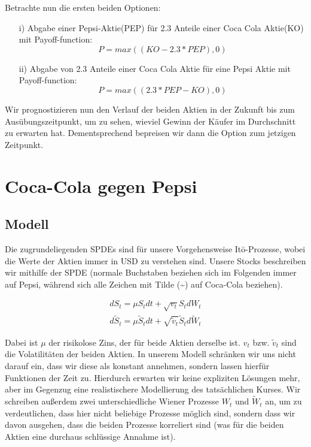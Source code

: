 \documentclass[12pt]{article}
\begin{document}
Betrachte nun die ersten beiden Optionen:
\begin{itemize}
	\item[i)] Abgabe einer Pepsi-Aktie(PEP) für 2.3 Anteile einer Coca Cola Aktie(KO) mit Payoff-function:
	\begin{equation*}
	P=max((KO-2.3*PEP),0)
	\end{equation*}			
	\item[ii)] Abgabe von 2.3 Anteile einer Coca Cola Aktie für eine Pepsi Aktie mit Payoff-function:
	\begin{equation*}
	P=max((2.3*PEP-KO),0)
	\end{equation*}			
\end{itemize}

Wir prognostizieren nun den Verlauf der beiden Aktien in der Zukunft bis zum Ausübungszeitpunkt, um zu sehen, wieviel Gewinn der Käufer im Durchschnitt zu erwarten hat. Dementsprechend bepreisen wir dann die Option zum jetzigen Zeitpunkt.


\section{Coca-Cola gegen Pepsi}

\subsection{Modell}

Die zugrundeliegenden SPDEs sind für unsere Vorgehensweise It\={o}-Prozesse, wobei die Werte der Aktien immer in USD zu verstehen sind. Unsere Stocks beschreiben wir mithilfe der SPDE (normale Buchstaben beziehen sich im Folgenden immer auf Pepsi, während sich alle Zeichen mit Tilde (\~{}) auf Coca-Cola beziehen).

\begin{align}\label{SPDEstock}
dS_t = \mu S_t dt + \sqrt{v_t} S_t dW_t \\
d\tilde{S}_t = \mu \tilde{S}_t dt + \sqrt{\tilde{v}_t} \tilde{S}_t d\tilde{W}_t
\end{align}

Dabei ist $\mu$ der risikolose Zins, der für beide Aktien derselbe ist. $v_t$ bzw. $\tilde{v}_t$ sind die Volatilitäten der beiden Aktien. In unserem Modell schränken wir uns nicht darauf ein, dass wir diese als konstant annehmen, sondern lassen hierfür Funktionen der Zeit zu. Hierdurch erwarten wir keine expliziten Lösungen mehr, aber im Gegenzug eine realistischere Modellierung des tatsächlichen Kurses. Wir schreiben außerdem zwei unterschiedliche Wiener Prozesse $W_t$ und $\tilde{W}_t$ an, um zu verdeutlichen, dass hier nicht beliebige Prozesse möglich sind, sondern dass wir davon ausgehen, dass die beiden Prozesse korreliert sind (was für die beiden Aktien eine durchaus schlüssige Annahme ist).
\end{document}
